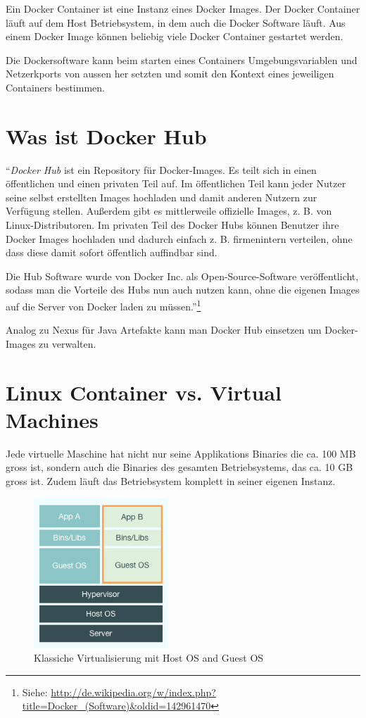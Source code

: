 Ein Docker Container ist eine Instanz eines Docker Images. Der Docker Container läuft
auf dem Host Betriebsystem, in dem auch die Docker Software läuft. Aus einem Docker Image
können beliebig viele Docker Container gestartet werden.

Die Dockersoftware kann beim starten eines Containers Umgebungsvariablen und Netzerkports
von aussen her setzten und somit den Kontext eines jeweiligen Containers bestimmen.

\section{Was ist Docker Hub}

“\textit{Docker Hub} ist ein Repository für Docker-Images. Es teilt sich in einen öffentlichen
und einen privaten Teil auf. Im öffentlichen Teil kann jeder Nutzer seine selbst erstellten
Images hochladen und damit anderen Nutzern zur Verfügung stellen. Außerdem gibt es mittlerweile
offizielle Images, z. B. von Linux-Distributoren. Im privaten Teil des Docker Hubs können
Benutzer ihre Docker Images hochladen und dadurch einfach z. B. firmenintern verteilen, ohne
dass diese damit sofort öffentlich auffindbar sind.

Die Hub Software wurde von Docker Inc. als Open-Source-Software veröffentlicht, sodass
man die Vorteile des Hubs nun auch nutzen kann, ohne die eigenen Images auf die Server
von Docker laden zu müssen.”\footnote{Siehe: \url{http://de.wikipedia.org/w/index.php?title=Docker_(Software)&oldid=142961470}}

Analog zu Nexus für Java Artefakte kann man Docker Hub einsetzen um Docker-Images
zu verwalten.

\section{Linux Container vs. Virtual Machines}

Jede virtuelle Maschine hat nicht nur seine Applikations Binaries die ca. 100 MB gross ist, sondern
auch die Binaries des gesamten Betriebsystems, das ca. 10 GB gross ist. Zudem läuft das Betriebsystem
komplett in seiner eigenen Instanz.

\begin{figure}[htbp]
  \begin{center}
    \includegraphics[width=0.45\textwidth]{./images/classic_virtual_machine.png}
    \caption{Klassiche Virtualisierung mit Host OS and Guest OS}
    \label{img:classic_virtual_machine}
  \end{center}
\end{figure}

